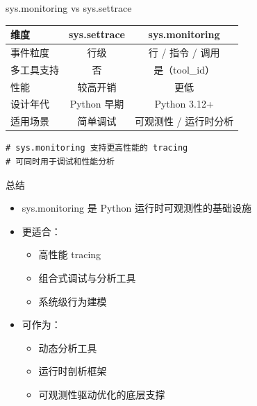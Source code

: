 \documentclass{beamer}
\begin{document}
\begin{frame}[fragile]{sys.monitoring vs sys.settrace}
\begin{tabular}{l|c|c}
维度 & sys.settrace & sys.monitoring \\
\hline
事件粒度 & 行级 & 行 / 指令 / 调用 \\
多工具支持 & 否 & 是（tool\_id） \\
性能 & 较高开销 & 更低 \\
设计年代 & Python 早期 & Python 3.12+ \\
适用场景 & 简单调试 & 可观测性 / 运行时分析 \\
\end{tabular}

\begin{verbatim}
# sys.monitoring 支持更高性能的 tracing
# 可同时用于调试和性能分析
\end{verbatim}
\end{frame}

\begin{frame}[fragile]{总结}
\begin{itemize}
  \item sys.monitoring 是 Python 运行时可观测性的基础设施
  \item 更适合：
    \begin{itemize}
      \item 高性能 tracing
      \item 组合式调试与分析工具
      \item 系统级行为建模
    \end{itemize}
  \item 可作为：
    \begin{itemize}
      \item 动态分析工具
      \item 运行时剖析框架
      \item 可观测性驱动优化的底层支撑
    \end{itemize}
\end{itemize}

\begin{verbatim}
\end{verbatim}
\end{frame}
\end{document}
